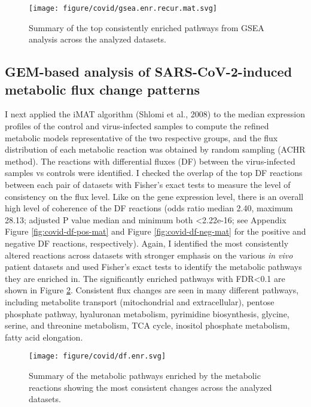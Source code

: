\documentclass[12pt,twoside,openany,\mydriver]{thesis}  %
\begin{document}
\begin{figure}
\texttt{[image: figure/covid/gsea.enr.recur.mat.svg]} \caption{Summary of the top consistently enriched pathways from GSEA analysis across the analyzed datasets.}\label{fig:covid-de-gsea-consensus}
\end{figure}
\hypertarget{gem-based-analysis-of-sars-cov-2-induced-metabolic-flux-change-patterns}{%
\subsection{GEM-based analysis of SARS-CoV-2-induced metabolic flux change patterns}\label{gem-based-analysis-of-sars-cov-2-induced-metabolic-flux-change-patterns}}

I next applied the iMAT algorithm (Shlomi et al., 2008) to the median expression profiles of the control and virus-infected samples to compute the refined metabolic models representative of the two respective groups, and the flux distribution of each metabolic reaction was obtained by random sampling (ACHR method). The reactions with differential fluxes (DF) between the virus-infected samples vs controls were identified. I checked the overlap of the top DF reactions between each pair of datasets with Fisher's exact tests to measure the level of consistency on the flux level. Like on the gene expression level, there is an overall high level of coherence of the DF reactions (odds ratio median 2.40, maximum 28.13; adjusted P value median and minimum both \textless{}2.22e-16; see Appendix Figure \ref{fig:covid-df-pos-mat} and Figure \ref{fig:covid-df-neg-mat} for the positive and negative DF reactions, respectively). Again, I identified the most consistently altered reactions across datasets with stronger emphasis on the various \emph{in vivo} patient datasets and used Fisher's exact tests to identify the metabolic pathways they are enriched in. The significantly enriched pathways with FDR\textless{}0.1 are shown in Figure \ref{fig:covid-df-path-consensus}. Consistent flux changes are seen in many different pathways, including metabolite transport (mitochondrial and extracellular), pentose phosphate pathway, hyaluronan metabolism, pyrimidine biosynthesis, glycine, serine, and threonine metabolism, TCA cycle, inositol phosphate metabolism, fatty acid elongation.
\begin{figure}
\texttt{[image: figure/covid/df.enr.svg]} \caption{Summary of the metabolic pathways enriched by the metabolic reactions showing the most consistent changes across the analyzed datasets.}\label{fig:covid-df-path-consensus}
\end{figure}
\end{document}
